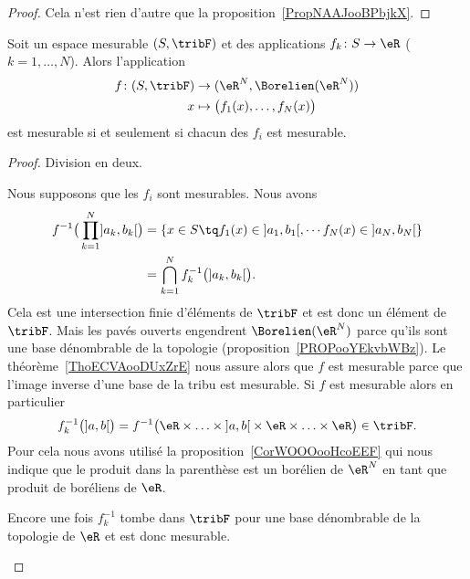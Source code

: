 \begin{proof}
	Cela n'est rien d'autre que la proposition~\ref{PropNAAJooBPbjkX}.
\end{proof}

\begin{proposition}
	Soit un espace mesurable \( (S,\tribF)\) et des applications \( f_k\colon S\to \eR\) (\( k=1,\ldots, N\)). Alors l'application
	\begin{equation}
		\begin{aligned}
			f\colon (S,\tribF) & \to (\eR^N,\Borelien(\eR^N))              \\
			x                  & \mapsto \big( f_1(x),\ldots, f_N(x) \big)
		\end{aligned}
	\end{equation}
	est mesurable si et seulement si chacun des \( f_i\) est mesurable.
\end{proposition}

\begin{proof}
	Division en deux.
	\begin{subproof}
		Nous supposons que les \( f_i\) sont mesurables. Nous avons
		\begin{subequations}
			\begin{align}
				f^{-1}\big( \prod_{k=1}^N\mathopen] a_k , b_k \mathclose[ \big) & =\{ x\in S\tq f_1(x)\in\mathopen] a_1 , b_1 \mathclose[ ,\cdots f_N(x)\in\mathopen] a_N , b_N \mathclose[\} \\
				                                                                & =\bigcap_{k=1}^Nf_k^{-1}\big( \mathopen] a_k , b_k \mathclose[ \big).
			\end{align}
		\end{subequations}
		Cela est une intersection finie d'éléments de \( \tribF\) et est donc un élément de \( \tribF\). Mais les pavés ouverts engendrent \( \Borelien(\eR^N)\) parce qu'ils sont une base dénombrable de la topologie (proposition~\ref{PROPooYEkvbWBz}). Le théorème~\ref{ThoECVAooDUxZrE} nous assure alors que \( f\) est mesurable parce que l'image inverse d'une base de la tribu est mesurable.
		Si \( f\) est mesurable alors en particulier
		\begin{equation}
			f_k^{-1}\big( \mathopen] a , b \mathclose[ \big)=f^{-1}\big( \eR\times\ldots\times \mathopen] a , b \mathclose[\times \eR\times\ldots\times \eR \big)\in\tribF.
		\end{equation}
		Pour cela nous avons utilisé la proposition~\ref{CorWOOOooHcoEEF} qui nous indique que le produit dans la parenthèse est un borélien de \( \eR^N\) en tant que produit de boréliens de \( \eR\).

		Encore une fois \( f_k^{-1}\) tombe dans \( \tribF\) pour une base dénombrable de la topologie de \( \eR\) et est donc mesurable.
	\end{subproof}
\end{proof}
